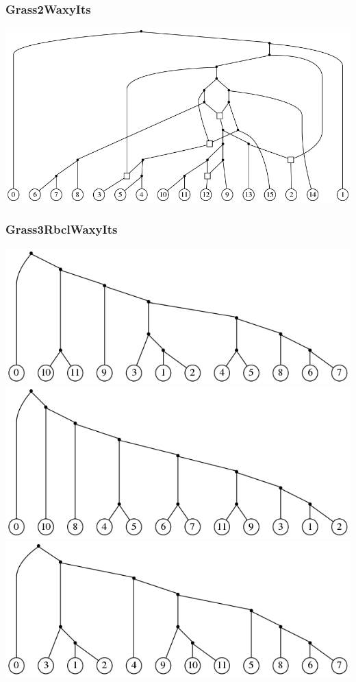 \documentclass[hyperref={unicode}]{beamer}
\begin{document}
\begin{frame}
\frametitle{Grass2WaxyIts}

\includegraphics[width=\linewidth]{img/Grass2WaxyIts}
	
\end{frame}

\begin{frame}
\frametitle{Grass3RbclWaxyIts}

\centering
\includegraphics[width=0.54\linewidth]{img/Grass3RbclWaxyIts_tree0}
\\
\includegraphics[width=0.54\linewidth]{img/Grass3RbclWaxyIts_tree1}
\\
\includegraphics[width=0.54\linewidth]{img/Grass3RbclWaxyIts_tree2}

\end{frame}
\end{document}
